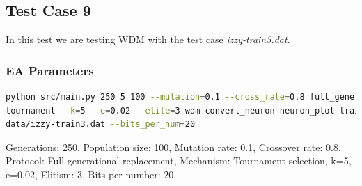 \subsection{Test Case 9}\label{sec:test-case-9}
In this test we are testing WDM with the test case
\textit{izzy-train3.dat}.
\subsubsection{EA Parameters}\label{sec:test-case-9-parameters}
\begin{lstlisting}[frame=single, language=bash, caption=Command-line to
replicate the results]
python src/main.py 250 5 100 --mutation=0.1 --cross_rate=0.8 full_generational
tournament --k=5 --e=0.02 --elite=3 wdm convert_neuron neuron_plot training\
data/izzy-train3.dat --bits_per_num=20
\end{lstlisting}
Generations: 250, Population size: 100, Mutation rate: 0.1, Crossover rate: 0.8, Protocol: Full generational replacement, Mechanism: Tournament selection, k=5, e=0.02, Elitism: 3, Bits per number: 20
